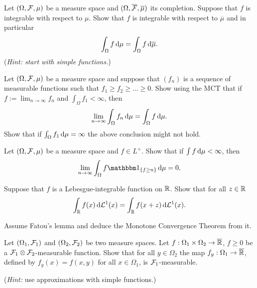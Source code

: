 \begin{problem}
    Let $(\Omega,\mathcal F,\mu)$ be a measure space and  $(\Omega,\overline{\mathcal F},\overline{\mu})$ its completion. Suppose that $f$ is integrable with respect to $\mu$. Show that $f$ is integrable with respect to $\overline{\mu}$ and in particular 
    \begin{equation*}
        \int_{\Omega} f\,\mathrm{d} \mu =  \int_{\Omega} f\,\mathrm{d} \overline{\mu}.
    \end{equation*}
    (\emph{Hint: start with simple functions.})
\end{problem}

\begin{problem} Let $(\Omega,\mathcal F,\mu)$ be a measure space and suppose that $(f_{n})$ is a sequence of measurable functions such that $f_1\geq f_2\geq\ldots \geq 0$. Show using the MCT that if $f :=\lim_{n\to\infty} f_n$ and $\int_{\Omega} f_1<\infty$, then
\begin{equation*}
    \lim_{n\to\infty} \int_\Omega f_n\,\mathrm{d} \mu =  \int_\Omega f\,\mathrm{d} \mu.
\end{equation*}
Show that if $\int_{\Omega} f_1\,\mathrm{d} \mu = \infty$ the above conclusion might not hold.    
\end{problem}

\begin{problem}
    Let $(\Omega,\mathcal F,\mu)$ be a measure space and $f\in L^+$. Show that if $\int f\,\mathrm{d} \mu <\infty$, then
    \begin{equation*}
        \lim_{n\to\infty} \int_\Omega f \ind{f\geq n} \,\De \mu = 0. 
    \end{equation*}
\end{problem}

\begin{problem} Suppose that $f$ is a Lebesgue-integrable function on $\mathbb R$. Show that for all $z\in \mathbb R$
    \begin{equation*}
        \int_{\mathbb R} f(x)\,\mathrm{d} \mathcal L^1(x) = \int_{\mathbb R} f(x+z)\,\mathrm{d} \mathcal L^1(x).
    \end{equation*}
\end{problem}

\begin{problem}
    Assume Fatou's lemma and deduce the Monotone Convergence Theorem from it.
\end{problem}

\begin{problem}
    Let $(\Omega_1,\mathcal F_1)$ and $(\Omega_2,\mathcal F_2)$ be two measure spaces. Let $f:\Omega_1\times\Omega_2\to \overline{\mathbb R}$, $f\geq 0$ be a $\mathcal F_1\otimes \mathcal F_2$-measurable function. Show that for all $y\in \Omega_2$ the map $f_y : \Omega_1\to \overline{\mathbb R}$, defined by $f_y(x) = f(x,y)$ for all $x\in \Omega_1$, is $\mathcal F_1$-measurable.

    \noindent (\emph{Hint:} use approximations with simple functions.)
\end{problem}
